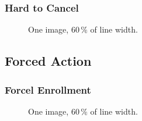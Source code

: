         \subsubsection*{Hard to Cancel}
        \blind[1]
        \begin{figure}
            \centering
            \caption{One image, $60\,\%$ of line width.  
              }
            \label{fig:TODO}
        \end{figure}
    \subsection*{Forced Action}
    \blind[1]
        \subsubsection*{Forcel Enrollment}
        \blind[1]
        \begin{figure}
            \centering
            \caption{One image, $60\,\%$ of line width.  
              }
            \label{fig:TODO}
        \end{figure}